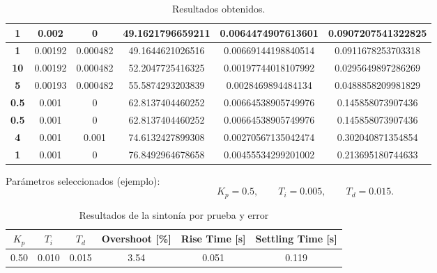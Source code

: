 \begin{table}[]
\begin{tabular}{|S|S|S|S|S|S|}
		\textbf{1}    & 0.002   & 0           & 49.1621796659211   & 0.0064474907613601   & 0.0907207541322825    \\ \hline
		\textbf{1}    & 0.00192 & 0.000482    & 49.1644621026516   & 0.00669144198840514  & 0.0911678253703318    \\ \hline
		\textbf{10}   & 0.00192 & 0.000482    & 52.2047725416325   & 0.00197744018107992  & 0.0295649897286269    \\ \hline
		\textbf{5}    & 0.00193 & 0.000482    & 55.5874293203839   & 0.0028469894484134   & 0.0488858209981829    \\ \hline
		\textbf{0.5}  & 0.001   & 0           & 62.8137404460252   & 0.00664538905749976  & 0.145858073907436     \\ \hline
		\textbf{0.5}  & 0.001   & 0           & 62.8137404460252   & 0.00664538905749976  & 0.145858073907436     \\ \hline
		\textbf{4}    & 0.001   & 0.001       & 74.6132427899308   & 0.00270567135042474  & 0.302040871354854     \\ \hline
		\textbf{1}    & 0.001   & 0           & 76.8492964678658   & 0.00455534299201002  & 0.213695180744633     \\ \hline
	\end{tabular}
	\caption{Resultados obtenidos.}
	\label{tab:resultadosPID}
\end{table}
\twocolumn

Parámetros seleccionados (ejemplo):
\[
K_p = 0.5,\qquad T_i = 0.005,\qquad T_d = 0.015.
\]

\begin{table}[H]
	\centering
	\small
	\caption{Resultados de la sintonía por prueba y error}
	\label{tab:pid_resultados}
	\begin{tabular}{cccccc}
		\hline
		$K_p$ & $T_i$ & $T_d$ & Overshoot [\%] & Rise Time [s] & Settling Time [s] \\
		\hline
		0.50 & 0.010 & 0.015 & 3.54 & 0.051 & 0.119 \\
		\hline
	\end{tabular}
\end{table}
